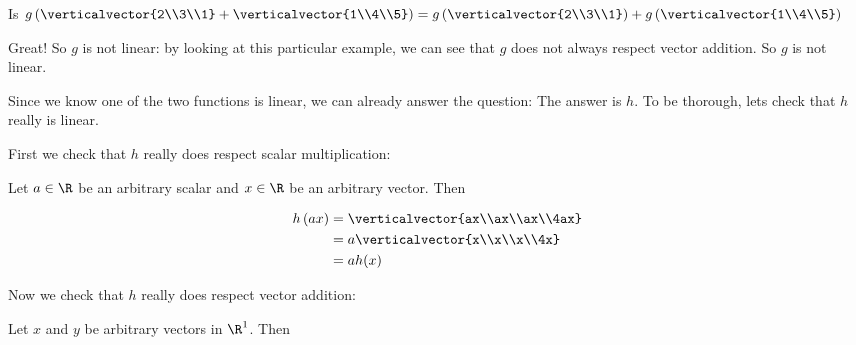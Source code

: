 \documentclass{ximera}
\begin{document}
\begin{question}
\begin{solution}
\begin{hint}
\begin{question}
\begin{solution}
\begin{matrix-answer}[name=v]
        	 \end{matrix-answer}
        	\end{solution}
        	\begin{solution}
        		Is $g\left( \verticalvector{2\\3\\1}+\verticalvector{1\\4\\5}\right) = g\left(\verticalvector{2\\3\\1}\right)+g\left( \verticalvector{1\\4\\5}\right)$
        		\begin{multiple-choice}
        		\end{multiple-choice}
        	\end{solution}
        	
        	Great!  So $g$ is not linear:  by looking at this particular example, we can see that $g$ does not always respect vector addition.  So $g$ is not linear.
		
        	Since we know one of the two functions is linear, we can already answer the question:  The answer is $h$.  To be thorough, lets check that $h$ really is linear.
		
        	First we check that $h$ really does respect scalar multiplication:
		
        	Let $a \in \R$ be an arbitrary scalar and $x \in \R$ be an arbitrary vector.  Then
		
        	\begin{align*}
        	 h\left(ax\right) &= \verticalvector{ax\\ax\\ax\\4ax}\\
        	 &= a\verticalvector{x\\x\\x\\4x}\\
        	 &= ah(x)
        	 \end{align*}
		 
        	 Now we check that $h$ really does respect vector addition:
		 
        	 Let $x$ and $y$ be arbitrary vectors in $\R^1$.  Then
		 

\end{question}
\end{hint}
\end{solution}
\end{question}
\end{document}
